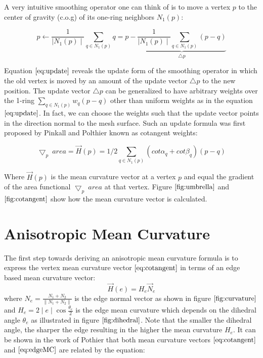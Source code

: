 \documentclass[11pt]{article}
\begin{document}
A very intuitive smoothing operator one can think of is to move a vertex $p$ to the center of gravity (c.o.g) of its one-ring neighbors $N_1(p)$:

\begin{equation}
p \leftarrow \frac{1}{\mid N_1(p) \mid}\sum\limits_{q \in N_1(p)}q = p - \underbrace{\frac{1}{\mid N_1(p) \mid}\sum\limits_{q \in N_1(p)}(p - q)}_{\bigtriangleup p}
\label{eq:update}
\end{equation}

Equation $\ref{eq:update}$ reveals the update form of the smoothing operator in which the old vertex is moved by an amount of the update vector $\bigtriangleup p$ to the new position. The update vector $\bigtriangleup p$ can be generalized to have arbitrary weights over the 1-ring $\sum\limits_{q \in N_1(p)}w_q(p - q)$ other than uniform weights as in the equation $\ref{eq:update}$. In fact, we can choose the weights such that the update vector points in the direction normal to the mesh surface. Such an update formula was first proposed by Pinkall and Polthier \cite{Pinkall93computingdiscrete} known as cotangent weights:

\begin{equation}
\bigtriangledown_p\ area = \vec{H}(p) = 1/2\sum\limits_{q \in N_1(p)}{(cot\alpha_{q} + cot\beta_{q})(p-q)}
\label{eq:cotangent}
\end{equation}

Where $\vec{H}(p)$ is the mean curvature vector at a vertex $p$ and equal the gradient of the area functional $\bigtriangledown_p\ area$ at that vertex. Figure $\ref{fig:umbrella}$ and $\ref{fig:cotangent}$ show how the mean curvature vector is calculated.

\section{Anisotropic Mean Curvature}

The first step towards deriving an anisotropic mean curvature formula is to express the vertex mean curvature vector $\ref{eq:cotangent}$ in terms of an edge based mean curvature vector:
\begin{equation}
  \vec{H}(e) = H_e \vec{N}_e
  \label{eq:edgeMC}
\end{equation}
where $N_e = \frac{N_1 + N_2}{\parallel N_1 + N_2 \parallel}$ is the edge normal vector as shown in figure $\ref{fig:curvature}$ and $H_e = 2\mid e \mid \cos \frac{\theta_e}{2}$ is the edge mean curvature which depends on the dihedral angle $\theta_e$ as illustrated in figure $\ref{fig:dihedral}$. Note that the smaller the dihedral angle, the sharper the edge resulting in the higher the mean curvature $H_e$. It can be shown in the work of Pothier \cite{PolthierHabilitation} that both mean curvature vectors $\ref{eq:cotangent}$ and $\ref{eq:edgeMC}$ are related by the equation:
\end{document}
